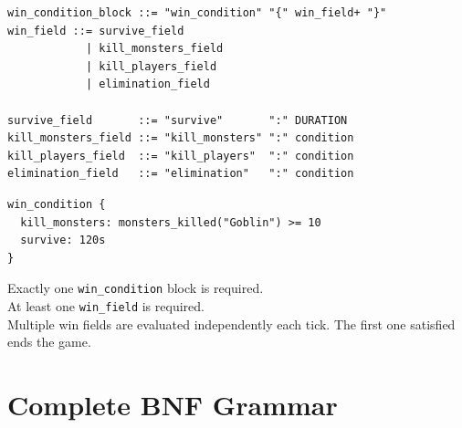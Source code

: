 \documentclass[12pt,a4paper]{article}
\begin{document}
\begin{lstlisting}[style=bnf]
win_condition_block ::= "win_condition" "{" win_field+ "}"
win_field ::= survive_field
            | kill_monsters_field
            | kill_players_field
            | elimination_field

survive_field       ::= "survive"       ":" DURATION
kill_monsters_field ::= "kill_monsters" ":" condition
kill_players_field  ::= "kill_players"  ":" condition
elimination_field   ::= "elimination"   ":" condition
\end{lstlisting}

\begin{lstlisting}[style=dsl]
win_condition {
  kill_monsters: monsters_killed("Goblin") >= 10
  survive: 120s
}
\end{lstlisting}

\begin{cbox}
Exactly one \texttt{win\_condition} block is required.\\
At least one \texttt{win\_field} is required.\\
Multiple win fields are evaluated independently each tick.
The first one satisfied ends the game.
\end{cbox}

\section{Complete BNF Grammar}
\end{document}
